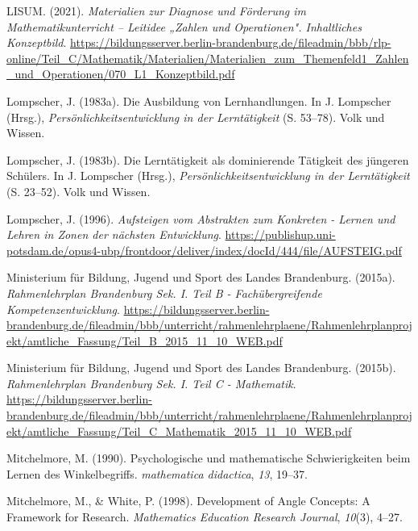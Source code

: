 \documentclass[
  ngerman,
]{scrbook}
\newlength{\cslhangindent}
\newlength{\cslentryspacingunit} %
\newenvironment{CSLReferences}[2] %
 {%
  \setlength{\parindent}{0pt}
  \ifodd #1
  \let\oldpar\par
  \def\par{\hangindent=\cslhangindent\oldpar}
  \fi
  \setlength{\parskip}{#2\cslentryspacingunit}
 }%
 {}
\theoremstyle{definition}
\theoremstyle{definition}
\theoremstyle{definition}
\theoremstyle{definition}
\theoremstyle{remark}
\begin{document}
\begin{CSLReferences}{1}{0}
\leavevmode{}%
LISUM. (2021). \emph{Materialien zur {Diagnose} und {Förderung} im {Mathematikunterricht} -- {Leitidee} „{Zahlen} und {Operationen}". {Inhaltliches} {Konzeptbild}}. \url{https://bildungsserver.berlin-brandenburg.de/fileadmin/bbb/rlp-online/Teil_C/Mathematik/Materialien/Materialien_zum_Themenfeld1_Zahlen_und_Operationen/070_L1_Konzeptbild.pdf}

\leavevmode{}%
Lompscher, J. (1983a). Die {Ausbildung} von {Lernhandlungen}. In J. Lompscher (Hrsg.), \emph{Persönlichkeitsentwicklung in der {Lerntätigkeit}} (S. 53--78). Volk und Wissen.

\leavevmode{}%
Lompscher, J. (1983b). Die {Lerntätigkeit} als dominierende {Tätigkeit} des jüngeren {Schülers}. In J. Lompscher (Hrsg.), \emph{Persönlichkeitsentwicklung in der {Lerntätigkeit}} (S. 23--52). Volk und Wissen.

\leavevmode{}%
Lompscher, J. (1996). \emph{Aufsteigen vom {Abstrakten} zum {Konkreten} - {Lernen} und {Lehren} in {Zonen} der nächsten {Entwicklung}}. \url{https://publishup.uni-potsdam.de/opus4-ubp/frontdoor/deliver/index/docId/444/file/AUFSTEIG.pdf}

\leavevmode{}%
Ministerium für Bildung, Jugend und Sport des Landes Brandenburg. (2015a). \emph{Rahmenlehrplan {Brandenburg} {Sek}. {I}. {Teil} {B} - {Fachübergreifende} {Kompetenzentwicklung}}. \url{https://bildungsserver.berlin-brandenburg.de/fileadmin/bbb/unterricht/rahmenlehrplaene/Rahmenlehrplanprojekt/amtliche_Fassung/Teil_B_2015_11_10_WEB.pdf}

\leavevmode{}%
Ministerium für Bildung, Jugend und Sport des Landes Brandenburg. (2015b). \emph{Rahmenlehrplan {Brandenburg} {Sek}. {I}. {Teil} {C} - {Mathematik}}. \url{https://bildungsserver.berlin-brandenburg.de/fileadmin/bbb/unterricht/rahmenlehrplaene/Rahmenlehrplanprojekt/amtliche_Fassung/Teil_C_Mathematik_2015_11_10_WEB.pdf}

\leavevmode{}%
Mitchelmore, M. (1990). Psychologische und mathematische Schwierigkeiten beim Lernen des Winkelbegriffs. \emph{mathematica didactica}, \emph{13}, 19--37.

\leavevmode{}%
Mitchelmore, M., \& White, P. (1998). Development of {Angle} {Concepts}: {A} {Framework} for {Research}. \emph{Mathematics Education Research Journal}, \emph{10}(3), 4--27.


\end{CSLReferences}
\end{document}
